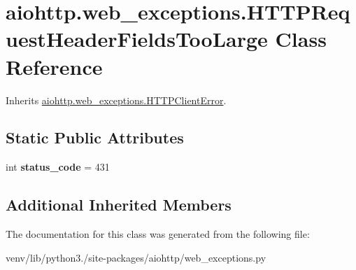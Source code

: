 \hypertarget{classaiohttp_1_1web__exceptions_1_1_h_t_t_p_request_header_fields_too_large}{}\section{aiohttp.\+web\+\_\+exceptions.\+H\+T\+T\+P\+Request\+Header\+Fields\+Too\+Large Class Reference}
\label{classaiohttp_1_1web__exceptions_1_1_h_t_t_p_request_header_fields_too_large}


Inherits \hyperlink{classaiohttp_1_1web__exceptions_1_1_h_t_t_p_client_error}{aiohttp.\+web\+\_\+exceptions.\+H\+T\+T\+P\+Client\+Error}.

\subsection*{Static Public Attributes}
\begin{DoxyCompactItemize}
\item 
\mbox{\label{classaiohttp_1_1web__exceptions_1_1_h_t_t_p_request_header_fields_too_large_a42d8eb8eca9fe2d146eb0c613081478f}} 
int {\bfseries status\+\_\+code} = 431
\end{DoxyCompactItemize}
\subsection*{Additional Inherited Members}


The documentation for this class was generated from the following file\+:\begin{DoxyCompactItemize}
\item 
venv/lib/python3./site-\/packages/aiohttp/web\+\_\+exceptions.\+py\end{DoxyCompactItemize}
